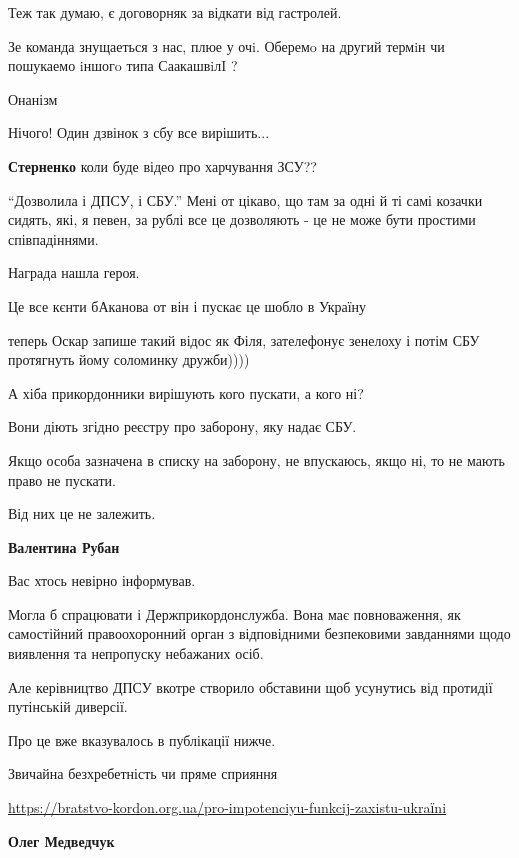 \begin{itemize}
Теж так думаю, є договорняк за відкати від гастролей.

Зе команда знущаеться з нас, плюе у очi. Оберемo на другий термiн чи пошукаемо iншогo типа СаакашвiлI ?

Онанізм

Нічого! Один дзвінок з сбу все вирішить...

\textbf{Стерненко} коли буде відео про харчування ЗСУ??

\enquote{Дозволила і ДПСУ, і СБУ.} Мені от цікаво, що там за одні й ті самі козачки
сидять, які, я певен, за рублі все це дозволяють - це не може бути простими
співпадіннями.

Награда нашла героя.

Це все кєнти бАканова от він і пускає це шобло в Україну


теперь Оскар запише такий відос як Філя, зателефонує зенелоху і потім СБУ
протягнуть йому соломинку дружби))))


А хіба прикордонники вирішують кого пускати, а кого ні?

Вони діють згідно реєстру про заборону, яку надає СБУ.

Якщо особа зазначена в списку на заборону, не впускаюсь, якщо ні, то не мають
право не пускати.

Від них це не залежить.

\begin{itemize}
\textbf{Валентина Рубан}

Вас хтось невірно інформував.

Могла б спрацювати і Держприкордонслужба. Вона має повноваження, як самостійний
правоохоронний орган з відповідними безпековими завданнями щодо виявлення та
непропуску небажаних осіб.

Але керівництво ДПСУ вкотре створило обставини щоб усунутись від протидії путінській диверсії.

Про це вже вказувалось в публікації нижче.

Звичайна безхребетність чи пряме сприяння\par
\url{https://bratstvo-kordon.org.ua/pro-impotenciyu-funkcij-zaxistu-ukraїni}

\textbf{Олег Медведчук}


\end{itemize}
\end{itemize}
